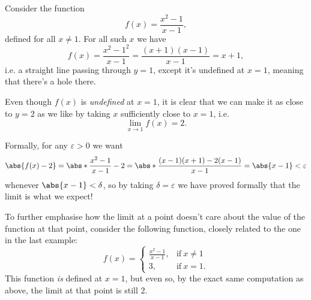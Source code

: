 \begin{example}\label{lec2:linewithhole}
	Consider the function
	\[
		f(x) = \frac{x^2 - 1}{x - 1},
	\]
	defined for all $x \neq 1$. For all such $x$ we have
	\[
		f(x) = \frac{x^2 - 1^2}{x - 1} = \frac{(x + 1)(x - 1)}{x - 1} = x + 1,
	\]
	i.e. a straight line passing through $y = 1$, except it's undefined at $x = 1$, meaning that there's a hole there.

	\begin{figure}[H]
		\centering
	\end{figure}

	\noindent
	Even though $f(x)$ is \emph{undefined} at $x = 1$, it is clear that we can make it as close to $y = 2$ as we like by taking $x$ sufficiently close to $x = 1$, i.e.
	\[
		\lim_{x \to 1} f(x) = 2.
	\]

	\noindent
	Formally, for any $\varepsilon > 0$ we want
	\[
		\abs{f(x) - 2} = \abs*{\frac{x^2 - 1}{x - 1} - 2} = \abs*{\frac{(x - 1)(x + 1) - 2 (x - 1)}{x - 1}} = \abs{x - 1} < \varepsilon
	\]
	whenever $\abs{x - 1} < \delta$, so by taking $\delta = \varepsilon$ we have proved formally that the limit is what we expect!
\end{example}

\begin{example}
	To further emphasise how the limit at a point doesn't care about the value of the function at that point, consider the following function, closely related to the one in the last example:
	\[
		f(x) = \begin{cases}
		\frac{x^2 - 1}{x - 1}, & \text{if}~ x \neq 1 \\
		3, & \text{if}~ x = 1.
		\end{cases}
	\]
	This function \emph{is} defined at $x = 1$, but even so, by the exact same computation as above, the limit at that point is still $2$.
\end{example}

